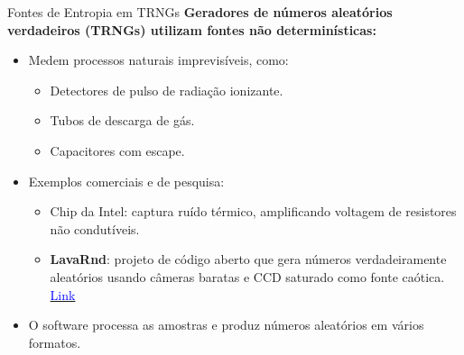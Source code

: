 \begin{frame}{Fontes de Entropia em TRNGs}
    \textbf{Geradores de números aleatórios verdadeiros (TRNGs) utilizam fontes não determinísticas:}
    \begin{itemize}
        \item Medem processos naturais imprevisíveis, como:
              \begin{itemize}
                  \item Detectores de pulso de radiação ionizante.
                  \item Tubos de descarga de gás.
                  \item Capacitores com escape.
              \end{itemize}
        \item Exemplos comerciais e de pesquisa:
              \begin{itemize}
                  \item Chip da Intel: captura ruído térmico, amplificando voltagem de resistores não condutíveis.
                  \item \textbf{LavaRnd}: projeto de código aberto que gera números verdadeiramente aleatórios usando câmeras baratas e CCD saturado como fonte caótica. \href{http://www.lavarnd.org/}{\textcolor{blue}{Link}}
              \end{itemize}
        \item O software processa as amostras e produz números aleatórios em vários formatos.
    \end{itemize}
\end{frame}

